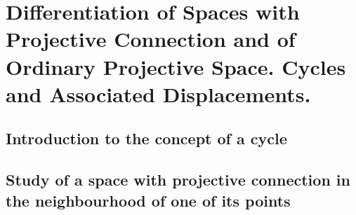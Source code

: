 
\chapter{Differentiation of Spaces with Projective Connection and of Ordinary Projective Space. Cycles and Associated Displacements.}
             
\section{Introduction to the concept of a cycle}

%
%
%


\section{Study of a space with projective connection in the neighbourhood of one of its points}

%
%
%































